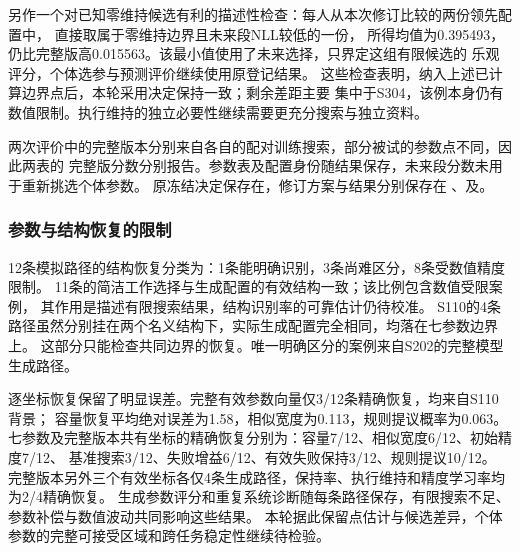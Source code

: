 \documentclass[11pt,a4paper]{article}
\numberwithin{equation}{section}
\begin{document}
另作一个对已知零维持候选有利的描述性检查：每人从本次修订比较的两份领先配置中，
直接取属于零维持边界且未来段NLL较低的一份，
所得均值为0.395493，仍比完整版高0.015563。该最小值使用了未来选择，只界定这组有限候选的
乐观评分，个体选参与预测评价继续使用原登记结果。
这些检查表明，纳入上述已计算边界点后，本轮采用决定保持一致；剩余差距主要
集中于S304，该例本身仍有数值限制。执行维持的独立必要性继续需要更充分搜索与独立资料。

两次评价中的完整版本分别来自各自的配对训练搜索，部分被试的参数点不同，因此两表的
完整版分数分别报告。参数表及配置身份随结果保存，未来段分数未用于重新挑选个体参数。
原冻结决定保存在，修订方案与结果分别保存在
、及。


\subsubsection{参数与结构恢复的限制}
12条模拟路径的结构恢复分类为：1条能明确识别，3条尚难区分，8条受数值精度限制。
11条的简洁工作选择与生成配置的有效结构一致；该比例包含数值受限案例，
其作用是描述有限搜索结果，结构识别率的可靠估计仍待校准。
S110的4条路径虽然分别挂在两个名义结构下，实际生成配置完全相同，均落在七参数边界上。
这部分只能检查共同边界的恢复。唯一明确区分的案例来自S202的完整模型生成路径。

逐坐标恢复保留了明显误差。完整有效参数向量仅3/12条精确恢复，均来自S110背景；
容量恢复平均绝对误差为1.58，相似宽度为0.113，规则提议概率为0.063。
七参数及完整版本共有坐标的精确恢复分别为：容量7/12、相似宽度6/12、初始精度7/12、
基准搜索3/12、失败增益6/12、有效失败保持3/12、规则提议10/12。
完整版本另外三个有效坐标各仅4条生成路径，保持率、执行维持和精度学习率均为2/4精确恢复。
生成参数评分和重复系统诊断随每条路径保存，有限搜索不足、参数补偿与数值波动共同影响这些结果。
本轮据此保留点估计与候选差异，个体参数的完整可接受区域和跨任务稳定性继续待检验。
\end{document}
